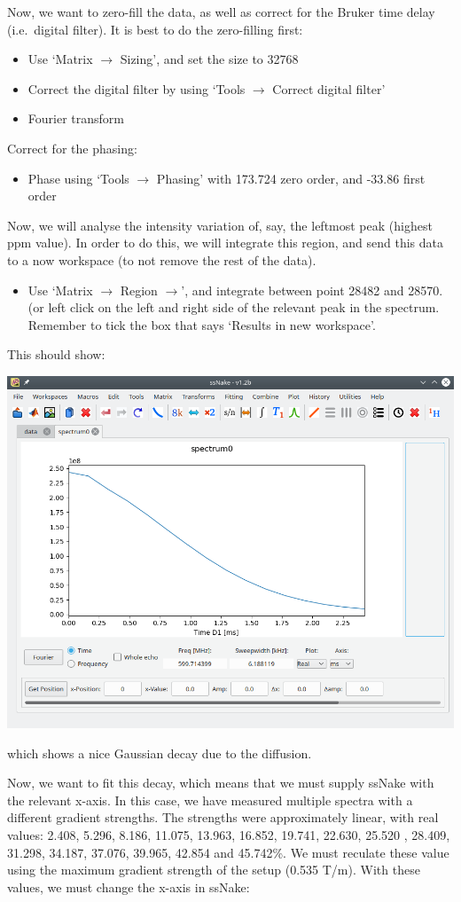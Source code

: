 \documentclass[11pt,a4paper]{article}
\begin{document}
Now, we want to zero-fill the data, as well as correct for the Bruker time delay (i.e.\ digital
filter). It is best to do the zero-filling first:
\begin{itemize}
  \item Use `Matrix $\longrightarrow$ Sizing', and set the size to 32768
  \item Correct the digital filter by using `Tools $\longrightarrow$ Correct digital filter'
  \item Fourier transform
\end{itemize}
Correct for the phasing:
\begin{itemize}
  \item Phase using `Tools $\longrightarrow$ Phasing' with 173.724 zero order, and -33.86 first
	 order
\end{itemize}
Now, we will analyse the intensity variation of, say, the leftmost peak (highest ppm value). In
order to do this, we will integrate this region, and send this data to a now workspace (to not
remove the rest of the data).
\begin{itemize}
  \item Use `Matrix $\longrightarrow$ Region $\longrightarrow$', and integrate between point 28482
	 and 28570. (or left click on the left and right side of the relevant peak in the spectrum.
	 Remember to tick the box that says `Results in new workspace'.
\end{itemize}
This should show:
\begin{center}
\includegraphics[width=0.8\linewidth]{Figs/Fig1.png}
\end{center}
which shows  a nice Gaussian decay due to the diffusion.

Now, we want to fit this decay, which means that we must supply ssNake with the relevant x-axis. In
this case, we have measured multiple spectra with a different gradient strengths. The strengths were
approximately linear, with real values: 2.408, 5.296, 8.186, 11.075, 13.963, 16.852, 19.741, 22.630,
25.520 , 28.409, 31.298, 34.187, 37.076, 39.965, 42.854 and 45.742\%. We must reculate these value
using the maximum gradient strength of the setup (0.535 T/m). With these values, we must change the
x-axis in ssNake:
\end{document}
